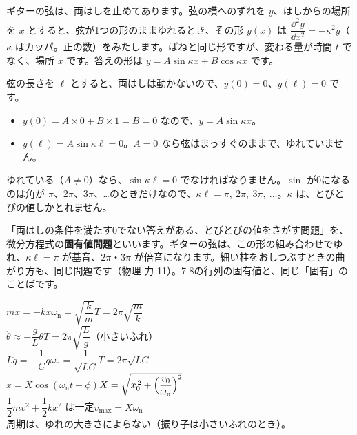 \begin{motto}[5]
ギターの弦は、両はしを止めてあります。弦の横へのずれを $y$、はしからの場所を $x$ とすると、弦が1つの形のままゆれるとき、その形 $y(x)$ は $\dfrac{\dd^2y}{\dd x^2}=-\kappa^2y$（$\kappa$ はカッパ。正の数）をみたします。ばねと同じ形ですが、変わる量が時間 $t$ でなく、場所 $x$ です。答えの形は $y=A\sin\kappa x+B\cos\kappa x$ です。

弦の長さを $\ell$ とすると、両はしは動かないので、$y(0)=0$、$y(\ell)=0$ です。
\begin{itemize}[leftmargin=1.2\zw, itemsep=1pt, topsep=2pt, label={\color{\bkTT}●}]
\item $y(0)=A\times0+B\times1=B=0$ なので、$y=A\sin\kappa x$。
\item $y(\ell)=A\sin\kappa\ell=0$。$A=0$ なら弦はまっすぐのままで、ゆれていません。
\end{itemize}
ゆれている（$A\neq0$）なら、$\sin\kappa\ell=0$ でなければなりません。$\sin$ が0になるのは角が $\pi$、$2\pi$、$3\pi$、…のときだけなので、$\kappa\ell=\pi,\ 2\pi,\ 3\pi,\ \dots$。$\kappa$ は、とびとびの値しかとれません。

\begin{bkcenter}
\end{bkcenter}
「両はしの条件を満たす0でない答えがある、とびとびの値をさがす問題」を、微分方程式の\textbf{固有値問題}といいます。ギターの弦は、この形の組み合わせでゆれ、$\kappa\ell=\pi$ が基音、$2\pi$・$3\pi$ が倍音になります。細い柱をおしつぶすときの曲がり方も、同じ問題です（物理 力-11）。7-8の行列の固有値と、同じ「固有」のことばです。
\end{motto}

\begin{taisetsu}
\def\tsl#1{\makebox[5.4\zw][l]{\sffamily\bfseries\small\color{\bkTT}#1}}
\tsl{ばね}$m\ddot x=-kx$\qquad $\omega_{\mathrm n}=\sqrt{\dfrac{k}{m}}$\qquad $T=2\pi\sqrt{\dfrac{m}{k}}$\\[3pt]
\tsl{振り子}$\ddot\theta\approx-\dfrac{g}{L}\theta$\qquad $T=2\pi\sqrt{\dfrac{L}{g}}$（小さいふれ）\\[3pt]
\tsl{LC回路}$L\ddot q=-\dfrac{1}{C}q$\qquad $\omega_{\mathrm n}=\dfrac{1}{\sqrt{LC}}$\qquad $T=2\pi\sqrt{LC}$\\[3pt]
\tsl{はじめの状態}$x=X\cos(\omega_{\mathrm n}t+\phi)$\qquad $X=\sqrt{x_0^{\,2}+\Bigl(\dfrac{v_0}{\omega_{\mathrm n}}\Bigr)^2}$\\[3pt]
\tsl{エネルギー}$\dfrac{1}{2}mv^2+\dfrac{1}{2}kx^2$ は一定\qquad $v_{\max}=X\omega_{\mathrm n}$\\[3pt]
\tsl{}周期は、ゆれの大きさによらない（振り子は小さいふれのとき）。
\end{taisetsu}

